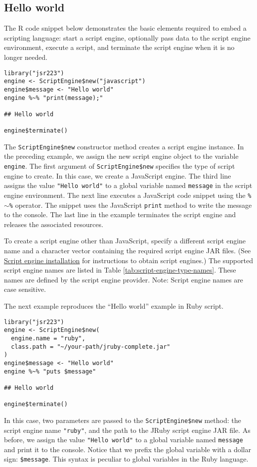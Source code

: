 \documentclass[
article,
11pt, %
a4paper, %
oneside, %
headinclude,footinclude, %
]{scrartcl}
\theoremstyle{definition} %
\theoremstyle{plain} %
\theoremstyle{remark} %
\newcommand{\code}[1]{\texttt{#1}}
\newcommand{\strong}[1]{\texorpdfstring{{\normalfont\fontseries{b}\selectfont #1}}{#1}}
\begin{document}
\subsection{Hello world}

The R code snippet below demonstrates the basic elements required to embed a scripting language: start a script engine, optionally pass data to the script engine environment, execute a script, and terminate the script engine when it is no longer needed.

\begin{verbatim}
library("jsr223")
engine <- ScriptEngine$new("javascript")
engine$message <- "Hello world"
engine %~% "print(message);"

## Hello world

engine$terminate()
\end{verbatim}

The \code{ScriptEngine\$new} constructor method creates a script engine instance. In the preceding example, we assign the new script engine object to the variable \code{engine}. The first argument of \code{ScriptEngine\$new} specifies the type of script engine to create. In this case, we create a JavaScript engine. The third line assigns the value \code{"Hello world"} to a global variable named \code{message} in the script engine environment. The next line executes a JavaScript code snippet using the \code{\%$\sim$\%} operator. The snippet uses the JavaScript \code{print} method to write the message to the console. The last line in the example terminates the script engine and releases the associated resources.

To create a script engine other than JavaScript, specify a different script engine name and a character vector containing the required script engine JAR files. (See \hyperlink{script-engine-installation}{Script engine installation} for instructions to obtain script engines.) The supported script engine names are listed in Table \ref{tab:script-engine-type-names}. These names are defined by the script engine provider. \strong{Note:} Script engine names are case sensitive.

The next example reproduces the “Hello world” example in Ruby script.

\begin{verbatim}
library("jsr223")
engine <- ScriptEngine$new(
  engine.name = "ruby",
  class.path = "~/your-path/jruby-complete.jar"
)
engine$message <- "Hello world"
engine %~% "puts $message"

## Hello world

engine$terminate()
\end{verbatim}
In this case, two parameters are passed to the \code{ScriptEngine\$new} method: the script engine name \code{"ruby"}, and the path to the JRuby script engine JAR file. As before, we assign the value \code{"Hello world"} to a global variable named \code{message} and print it to the console. Notice that we prefix the global variable with a dollar sign: \code{\$message}. This syntax is peculiar to global variables in the Ruby language.
\end{document}

